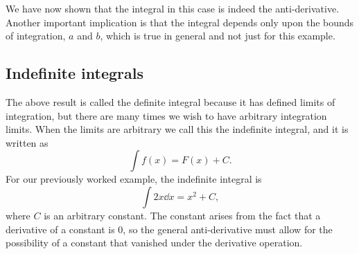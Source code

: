 We have now shown that the integral in this case is indeed the anti-derivative.
Another important implication is that the integral depends only upon the bounds
of integration, $a$ and $b$, which is true in general and not just for this
example.

\subsection{Indefinite integrals}
The above result is called the definite integral because it has defined limits
of integration, but there are many times we wish to have arbitrary integration
limits.  When the limits are arbitrary we call this the indefinite integral, and
it is written as
\begin{equation}
    \int f(x) = F(x) + C.
\end{equation}
For our previously worked example, the indefinite integral is
\begin{equation*}
    \int 2 x \dd{x} = x^2 + C,
\end{equation*}
where $C$ is an arbitrary constant.  The constant arises from the fact that a
derivative of a constant is 0, so the general anti-derivative must allow for
the possibility of a constant that vanished under the derivative operation.


